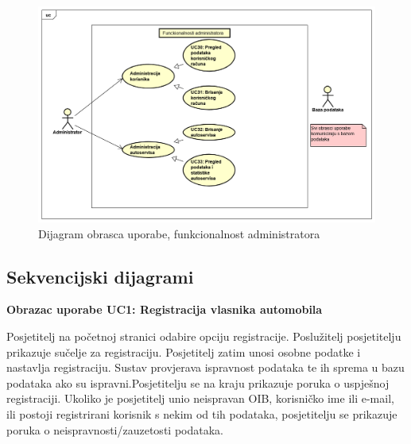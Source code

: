 \begin{figure}[H]
	\includegraphics[width=\linewidth]{dijagrami/diagram2.png}
	\centering
	\caption{Dijagram obrasca uporabe, funkcionalnost administratora}
	\label{fig:diagram2}
\end{figure}


\eject

\subsection{Sekvencijski dijagrami}


\noindent \textbf{Obrazac uporabe UC1: Registracija vlasnika automobila}

\noindent Posjetitelj na početnoj stranici odabire opciju registracije. Poslužitelj posjetitelju prikazuje sučelje za registraciju. Posjetitelj zatim unosi osobne podatke i nastavlja registraciju. Sustav provjerava ispravnost podataka te ih sprema u bazu podataka ako su ispravni.Posjetitelju se na kraju prikazuje poruka o uspješnoj registraciji. Ukoliko je posjetitelj unio neispravan OIB, korisničko ime ili e-mail, ili postoji registrirani korisnik s nekim od tih podataka, posjetitelju se prikazuje poruka o neispravnosti/zauzetosti podataka.

